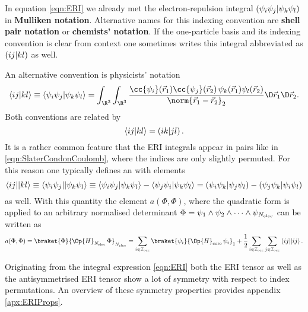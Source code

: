 \begin{rem}
	\label{rem:ERI}
	In equation \eqref{eqn:ERI} we already met
	the electron-repulsion integral $\left( \psi_i \psi_j \middle| \psi_k \psi_l \right)$
	in \textbf{Mulliken notation}.
	Alternative names for this indexing convention are
	\textbf{shell pair notation} or \textbf{chemists' notation}.
	If the one-particle basis and its indexing convention is clear
	from context one sometimes writes this integral
	abbreviated as $\left( ij \middle| kl \right)$ as well.

	\noindent
	An alternative convention is physicists' notation
	\[
		\eriPh{i j}{k l} \equiv
		\eriPh{\psi_i \psi_j}{\psi_k \psi_l}
		= \int_{\R^3} \int_{\R^3}
				\frac{\cc{\psi_i}(\vec{r}_1) \cc{\psi_j}(\vec{r}_2)
				\, \psi_k(\vec{r}_1) \psi_l(\vec{r}_2)}
				{\norm{\vec{r}_1 - \vec{r}_2}_2}
				\D \vec{r}_1 \D \vec{r}_2.
	\]
	Both conventions are related by
	\begin{equation}
		\left\langle i j \middle| k l \right\rangle = \left( i k \middle| j l \right).
		\label{eqn:EriMulPhys}
	\end{equation}
	It is a rather common feature that the ERI integrals appear in pairs
	like in \eqref{eqn:SlaterCondonCoulomb},
	where the indices are only slightly permuted.
	For this reason one typically defines an
	with elements
	\[ \left\langle ij \middle|\middle| kl \right\rangle \equiv
		\left\langle \psi_i \psi_j \middle|\middle| \psi_k \psi_l \right\rangle
		\equiv \left\langle \psi_i \psi_j \middle| \psi_k \psi_l \right\rangle
		- \left\langle \psi_j \psi_i \middle| \psi_k \psi_l \right\rangle
		= \left( \psi_i\psi_k \middle| \psi_j\psi_l \right) - \left( \psi_j\psi_k \middle| \psi_i\psi_l \right)
	\]
	as well. With this quantity the element $a(\Phi, \Phi)$,
	where the quadratic form is applied to an arbitrary normalised
	determinant $\Phi = \psi_1 \wedge \psi_2 \wedge \cdots \wedge \psi_{N_\text{elec}}$
	can be written as
	\begin{equation}
		a(\Phi, \Phi) = \braket{\Phi}{\Op{H}_{\Nelec} \, \Phi}_{\Nelec}
		= \sum_{i\in\Iocc} \braket{\psi_i}{\Op{H}_\text{core}\, \psi_i}_1
			+ \frac12 \sum_{i\in\Iocc} \sum_{j\in\Iocc} \eriAsym{ij}{ij}.
		\label{eqn:EnergySlaterDeterminant}
	\end{equation}

	Originating from the integral expression \eqref{eqn:ERI}
	both the ERI tensor as well as the antisymmetrised ERI tensor
	show a lot of symmetry with respect to index permutations.
	An overview of these symmetry properties provides appendix \vref{apx:ERIProps}.
\end{rem}
